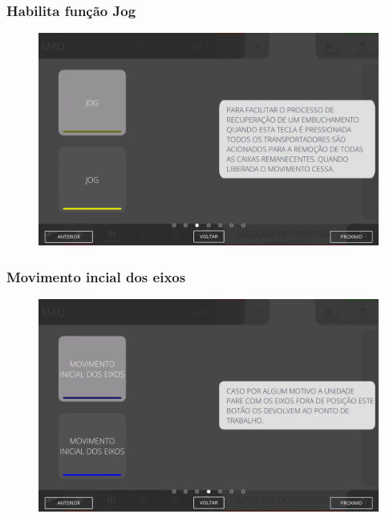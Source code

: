 \newpage
\thispagestyle{fancy}
\vspace*{40 pt}
\subsubsection{\small {Habilita função Jog}} \label{sec:telaComandosEmpilhador2HabilitaFuncaoJog}
\vspace*{\fill}
\begin{figure}[h]
    \centering
    \includegraphics[width=576 px,height=360 px]{src/imagesICV/08-stacker/commands/e-8.png}
\end{figure}
\vspace*{\fill}

\newpage
\thispagestyle{fancy}
\vspace*{40 pt}
\subsubsection{\small {Movimento incial dos eixos}} \label{sec:telaComandosEmpilhador2MovimentoInicialEixos}
\vspace*{\fill}
\begin{figure}[h]
    \centering
    \includegraphics[width=576 px,height=360 px]{src/imagesICV/08-stacker/commands/e-9.png}
\end{figure}
\vspace*{\fill}


